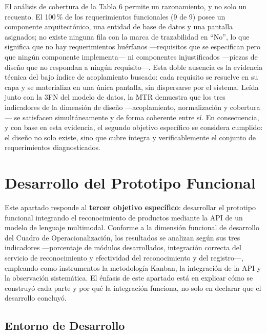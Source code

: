 \documentclass[12pt, letterpaper]{report}
\begin{document}
El análisis de cobertura de la Tabla 6 permite un razonamiento, y no
solo un recuento. El 100\,\% de los requerimientos funcionales (9 de
9) posee un componente arquitectónico, una entidad de base de datos y
una pantalla asignados; no existe ninguna fila con la marca de
trazabilidad en ``No'', lo que significa que no hay requerimientos
huérfanos ---requisitos que se especifican pero que ningún componente
implementa--- ni componentes injustificados ---piezas de diseño que no
respondan a ningún requisito---. Esta doble ausencia es la evidencia
técnica del bajo índice de acoplamiento buscado: cada requisito se
resuelve en su capa y se materializa en una única pantalla, sin
dispersarse por el sistema. Leída junto con la 3FN del modelo de datos,
la MTR demuestra que los tres indicadores de la dimensión de diseño
---acoplamiento, normalización y cobertura--- se satisfacen
simultáneamente y de forma coherente entre sí. En consecuencia, y con
base en esta evidencia, el segundo objetivo específico se considera
cumplido: el diseño no solo existe, sino que cubre íntegra y
verificablemente el conjunto de requerimientos diagnosticados.

\section{Desarrollo del Prototipo Funcional}

Este apartado responde al \textbf{tercer objetivo específico}:
desarrollar el prototipo funcional integrando el reconocimiento de
productos mediante la API de un modelo de lenguaje multimodal. Conforme
a la dimensión funcional de desarrollo del Cuadro de
Operacionalización, los resultados se analizan según sus tres
indicadores ---porcentaje de módulos desarrollados, integración
correcta del servicio de reconocimiento y efectividad del
reconocimiento y del registro---, empleando como instrumentos la
metodología Kanban, la integración de la API y la observación
sistemática. El énfasis de este apartado está en explicar cómo se
construyó cada parte y por qué la integración funciona, no solo en
declarar que el desarrollo concluyó.

\subsection{Entorno de Desarrollo}
\end{document}
